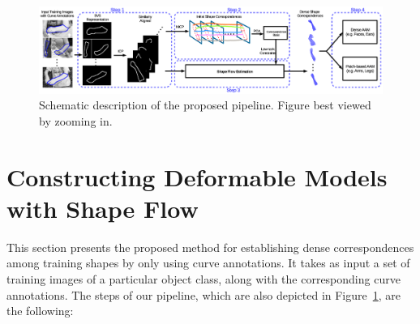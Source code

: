 \begin{figure}[t!]
    \centering
        \includegraphics[width=\textwidth]{resources/architecture3}
    \caption{Schematic description of the proposed pipeline. Figure best viewed by zooming in.}
    \label{fig:archi}
\end{figure}

\section{Constructing Deformable Models with Shape Flow}




This section presents the proposed method for establishing dense correspondences among training shapes
by only using curve annotations.
%
%
%
It takes as input a set of training images of a particular object class, along with the corresponding curve annotations. The steps of our pipeline, which are also depicted in Figure~\ref{fig:archi}, are the following:

